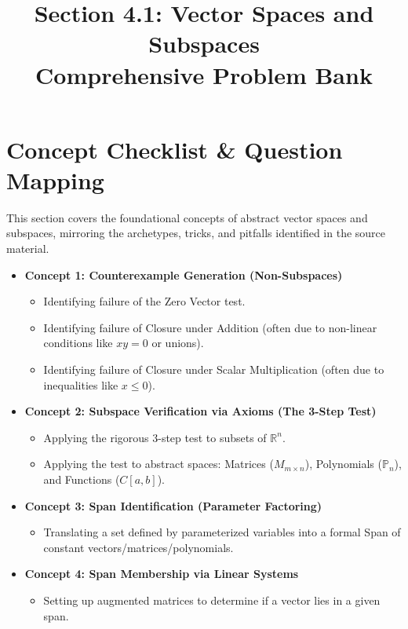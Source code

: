 \documentclass[11pt]{article}
\title{Section 4.1: Vector Spaces and Subspaces \\ Comprehensive Problem Bank}
\author{}
\date{}
\begin{document}
\maketitle
\tableofcontents
\newpage

\section{Concept Checklist \& Question Mapping}
This section covers the foundational concepts of abstract vector spaces and subspaces, mirroring the archetypes, tricks, and pitfalls identified in the source material.

\begin{itemize}
    \item \textbf{Concept 1: Counterexample Generation (Non-Subspaces)}
    \begin{itemize}
        \item Identifying failure of the Zero Vector test.
        \item Identifying failure of Closure under Addition (often due to non-linear conditions like $xy=0$ or unions).
        \item Identifying failure of Closure under Scalar Multiplication (often due to inequalities like $x \le 0$).
    \end{itemize}
    \item \textbf{Concept 2: Subspace Verification via Axioms (The 3-Step Test)}
    \begin{itemize}
        \item Applying the rigorous 3-step test to subsets of $\mathbb{R}^n$.
        \item Applying the test to abstract spaces: Matrices ($M_{m \times n}$), Polynomials ($\mathbb{P}_n$), and Functions ($C[a,b]$).
    \end{itemize}
    \item \textbf{Concept 3: Span Identification (Parameter Factoring)}
    \begin{itemize}
        \item Translating a set defined by parameterized variables into a formal Span of constant vectors/matrices/polynomials.
    \end{itemize}
    \item \textbf{Concept 4: Span Membership via Linear Systems}
    \begin{itemize}
        \item Setting up augmented matrices to determine if a vector lies in a given span.

\end{itemize}
\end{itemize}
\end{document}
